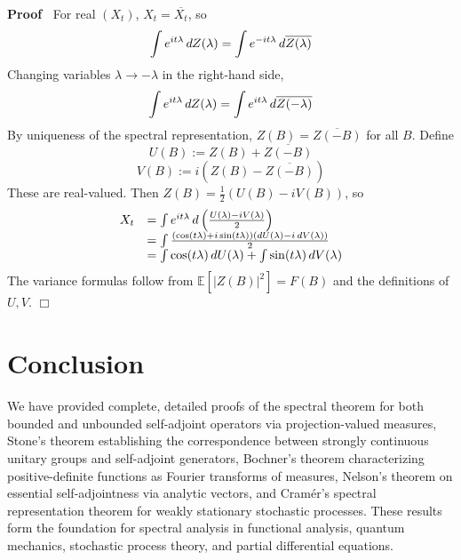 \documentclass{article}
\newcommand{\assign}{:=}
\newenvironment{proof}{\noindent\textbf{Proof\ }}{\hspace*{\fill}$\Box$\medskip}
\newcommand{\E}{\mathbb{E}}
\newcommand{\1}{\mathbbm{1}}
\begin{document}
\begin{proof}
  For real $(X_t)$, $X_t = \overline{X_t}$, so
  \begin{equation}
    \int e^{it \lambda}  \hspace{0.17em} dZ (\lambda) = \int e^{- it \lambda} 
    \hspace{0.17em} d \overline{Z (\lambda)}
  \end{equation}
  Changing variables $\lambda \to - \lambda$ in the right-hand side,
  \begin{equation}
    \int e^{it \lambda}  \hspace{0.17em} dZ (\lambda) = \int e^{it \lambda} 
    \hspace{0.17em} d \overline{Z (- \lambda)}
  \end{equation}
  By uniqueness of the spectral representation, $Z (B) = \overline{Z (- B)}$
  for all $B$. Define
  \begin{equation}
    U (B) \assign Z (B) + \overline{Z (- B)}
  \end{equation}
  \begin{equation}
    V (B) \assign i (Z (B) - \overline{Z (- B)})
  \end{equation}
  These are real-valued. Then $Z (B) = \frac{1}{2}  (U (B) - iV (B))$, so
  \begin{equation}
    \begin{array}{ll}
      X_t & = \int e^{it \lambda}  \hspace{0.17em} d \left( \frac{U (\lambda)
      - iV (\lambda)}{2} \right)\\
      & = \int \frac{(\cos (t \lambda) + i \sin (t \lambda))  (dU (\lambda) -
      i \hspace{0.17em} dV (\lambda))}{2}\\
      & = \int \cos (t \lambda)  \hspace{0.17em} dU (\lambda) + \int \sin (t
      \lambda)  \hspace{0.17em} dV (\lambda)
    \end{array}
  \end{equation}
  The variance formulas follow from $\E [|Z (B) |^2] = F (B)$ and the
  definitions of $U, V$.
\end{proof}

\section{Conclusion}

We have provided complete, detailed proofs of the spectral theorem for both
bounded and unbounded self-adjoint operators via projection-valued measures,
Stone's theorem establishing the correspondence between strongly continuous
unitary groups and self-adjoint generators, Bochner's theorem characterizing
positive-definite functions as Fourier transforms of measures, Nelson's
theorem on essential self-adjointness via analytic vectors, and Cram{\'e}r's
spectral representation theorem for weakly stationary stochastic processes.
These results form the foundation for spectral analysis in functional
analysis, quantum mechanics, stochastic process theory, and partial
differential equations.
\end{document}
